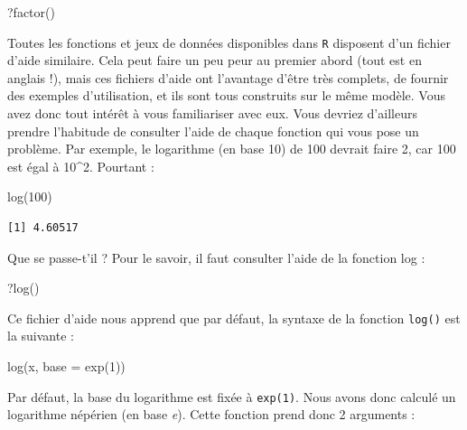 \documentclass[
  a4paper,
  DIV=11,
  numbers=noendperiod,
  oneside]{scrreprt}
\newenvironment{Shaded}{}{}
\newcommand{\AttributeTok}[1]{\textcolor[rgb]{0.84,0.23,0.29}{#1}}
\newcommand{\DecValTok}[1]{\textcolor[rgb]{0.00,0.36,0.77}{#1}}
\newcommand{\FunctionTok}[1]{\textcolor[rgb]{0.44,0.26,0.76}{#1}}
\newcommand{\NormalTok}[1]{\textcolor[rgb]{0.14,0.16,0.18}{#1}}
\begin{document}
\begin{Shaded}
\begin{Highlighting}[]
\NormalTok{?}\FunctionTok{factor}\NormalTok{()}
\end{Highlighting}
\end{Shaded}

Toutes les fonctions et jeux de données disponibles dans \texttt{R}
disposent d'un fichier d'aide similaire. Cela peut faire un peu peur au
premier abord (tout est en anglais !), mais ces fichiers d'aide ont
l'avantage d'être très complets, de fournir des exemples d'utilisation,
et ils sont tous construits sur le même modèle. Vous avez donc tout
intérêt à vous familiariser avec eux. Vous devriez d'ailleurs prendre
l'habitude de consulter l'aide de chaque fonction qui vous pose un
problème. Par exemple, le logarithme (en base 10) de 100 devrait faire
2, car 100 est égal à 10\^{}2. Pourtant :

\begin{Shaded}
\begin{Highlighting}[]
\FunctionTok{log}\NormalTok{(}\DecValTok{100}\NormalTok{)}
\end{Highlighting}
\end{Shaded}

\begin{verbatim}
[1] 4.60517
\end{verbatim}

Que se passe-t'il ? Pour le savoir, il faut consulter l'aide de la
fonction log :

\begin{Shaded}
\begin{Highlighting}[]
\NormalTok{?}\FunctionTok{log}\NormalTok{()}
\end{Highlighting}
\end{Shaded}

Ce fichier d'aide nous apprend que par défaut, la syntaxe de la fonction
\texttt{log()} est la suivante :

\begin{Shaded}
\begin{Highlighting}[]
\FunctionTok{log}\NormalTok{(x, }\AttributeTok{base =} \FunctionTok{exp}\NormalTok{(}\DecValTok{1}\NormalTok{))}
\end{Highlighting}
\end{Shaded}

Par défaut, la base du logarithme est fixée à \texttt{exp(1)}. Nous
avons donc calculé un logarithme népérien (en base \emph{e}). Cette
fonction prend donc 2 arguments :
\end{document}
